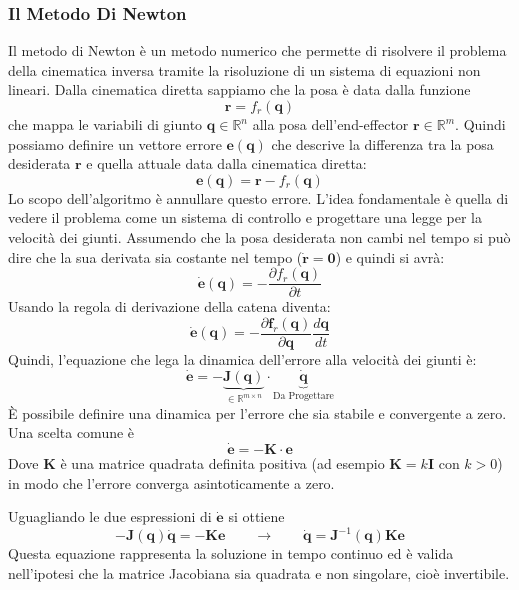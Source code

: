 \documentclass[11pt, a4paper]{report}
\begin{document}
\newpage
\subsubsection{Il Metodo Di Newton}
Il metodo di Newton è un metodo numerico che permette di risolvere il problema della cinematica inversa tramite la risoluzione di un sistema di equazioni non lineari. Dalla cinematica diretta sappiamo che la posa è data dalla funzione
\[
    \bm{r} = f_{r}(\bm{q})
\]
che mappa le variabili di giunto \(\bm{q} \in \mathbb{R}^n\) alla posa dell'end-effector \(\bm{r} \in \mathbb{R}^m\). Quindi possiamo definire un vettore errore \(\bm{e}(\bm{q})\) che descrive la differenza tra la posa desiderata \(\bm{r}\) e quella attuale data dalla cinematica diretta:
\[
    \bm{e}(\bm{q}) = \bm{r} - f_{r}(\bm{q})
\]
Lo scopo dell'algoritmo è annullare questo errore. L'idea fondamentale è quella di vedere il problema come un sistema di controllo e progettare una legge per la velocità dei giunti. Assumendo che la posa desiderata non cambi nel tempo si può dire che la sua derivata sia costante nel tempo (\(\dot{\bm{r}} = \bm{0}\)) e quindi si avrà:
\[
    \dot{\bm{e}}(\bm{q}) = - \frac{\partial f_{r}(\bm{q})}{\partial t}
\]
Usando la regola di derivazione della catena diventa:
\[
    \dot{\bm{e}}(\bm{q}) = -\frac{\partial \bm{f}_r(\bm{q})}{\partial \bm{q}} \frac{d\bm{q}}{dt}
\]
Quindi, l'equazione che lega la dinamica dell'errore alla velocità dei giunti è:
\[
    \boxed{\dot{\bm{e}} = - \underbrace{\bm{J}(\bm{q})}_{\in \mathbb{R}^{m \times n}} \cdot \underbrace{\dot{\bm{q}}}_{\text{Da Progettare}}}
\]
È possibile definire una dinamica per l'errore che sia stabile e convergente a zero.\\
Una scelta comune è
\[
    \dot{\bm{e}} = -\bm{K} \cdot \bm{e}
\]
Dove \(\bm{K}\) è una matrice quadrata definita positiva (ad esempio \(\bm{K} = k\bm{I}\) con \(k>0\)) in modo che l'errore converga asintoticamente a zero.

Uguagliando le due espressioni di \(\dot{\bm{e}}\) si ottiene
\[
    - \bm{J}(\bm{q}) \dot{\bm{q}} = -\bm{K} \bm{e}
    \qquad\longrightarrow\qquad
    \dot{\bm{q}} = \bm{J}^{-1}(\bm{q}) \bm{K} \bm{e}
\]
Questa equazione rappresenta la soluzione in tempo continuo ed è valida nell'ipotesi che la matrice Jacobiana sia quadrata e non singolare, cioè invertibile.
\end{document}

